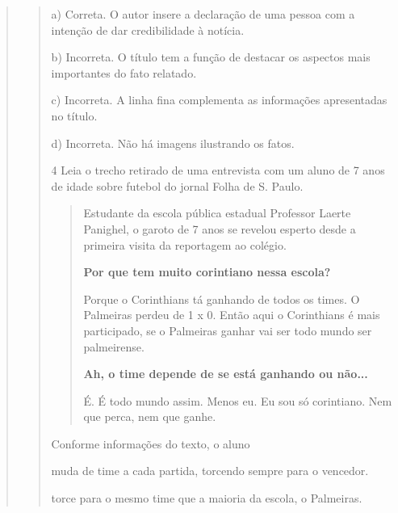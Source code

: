\begin{escolha}
\begin{escolha}
\begin{escolha}
\begin{quote}
\begin{quote}
{

a) Correta. O autor insere a declaração de uma pessoa com a intenção de
dar credibilidade à notícia.

b) Incorreta. O título tem a função de destacar os aspectos mais
importantes do fato relatado.

c) Incorreta. A linha fina complementa as informações apresentadas no
título.

d) Incorreta. Não há imagens ilustrando os fatos.

\num{4} Leia o trecho retirado de uma entrevista com um aluno de 7 anos
de idade sobre futebol do jornal Folha de S. Paulo.

\begin{quote}
Estudante da escola pública estadual Professor Laerte Panighel, o garoto
de 7 anos se revelou esperto desde a primeira visita da reportagem ao
colégio.

\textbf{Por que tem muito corintiano nessa escola?}

Porque o Corinthians tá ganhando de todos os times. O Palmeiras perdeu
de 1 x 0. Então aqui o Corinthians é mais participado, se o
Palmeiras ganhar vai ser todo mundo ser palmeirense.

\textbf{Ah, o time depende de se está ganhando ou não...}

É. É todo mundo assim. Menos eu. Eu sou só corintiano. Nem que perca,
nem que ganhe.
\end{quote}


Conforme informações do texto, o aluno

\begin{escolha}
\item muda de time a cada partida, torcendo sempre para o vencedor.

\item torce para o mesmo time que a maioria da escola, o Palmeiras.


\end{escolha}}
\end{quote}
\end{quote}
\end{escolha}
\end{escolha}
\end{escolha}
